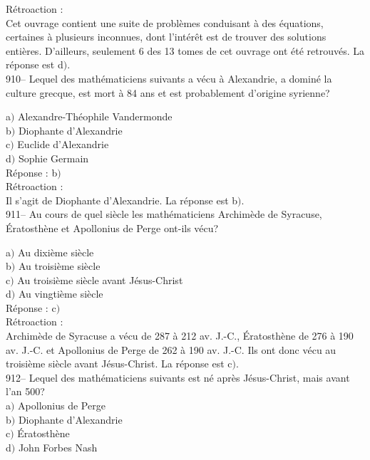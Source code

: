 ﻿\documentclass[letterpaper, 12pt]{article}
\begin{document}
R\'etroaction : \\
Cet ouvrage contient une suite de probl\`emes conduisant \`a des
\'equations, certaines \`a plusieurs inconnues, dont l'int\'er\^et
est de trouver des solutions enti\`eres.
D'ailleurs, seulement 6 des 13 tomes de cet ouvrage ont \'et\'e retrouv\'es.
La r\'eponse est d$)$.\\

910-- Lequel des math\'ematiciens suivants a v\'ecu \`a Alexandrie,
a domin\'e la culture grecque, est mort \`a 84 ans et est
probablement d'origine syrienne?

a$)$ Alexandre-Th\'eophile Vandermonde \\
b$)$ Diophante d'Alexandrie \\
c$)$ Euclide d'Alexandrie \\
d$)$ Sophie Germain\\

R\'eponse : b$)$\\

R\'etroaction : \\
Il s'agit de Diophante d'Alexandrie. La r\'eponse est b$)$.\\

911-- Au cours de quel si\`ecle les math\'ematiciens Archim\`ede de
Syracuse, \'Eratosth\`ene et Apollonius de Perge ont-ils v\'ecu?

a$)$ Au dixi\`eme si\`ecle \\
b$)$ Au troisi\`eme si\`ecle \\
c$)$ Au troisi\`eme si\`ecle avant J\'esus-Christ \\
d$)$ Au vingti\`eme si\`ecle   \\

R\'eponse : c$)$\\

R\'etroaction : \\
Archim\`ede de Syracuse a v\'ecu de 287 \`a 212 av. J.-C.,
\'Eratosth\`ene de 276 \`a 190 av. J.-C. et Apollonius de Perge de 262 \`a
190 av. J.-C. Ils ont donc v\'ecu au troisi\`eme si\`ecle avant
J\'esus-Christ. La r\'eponse est c$)$.\\

912-- Lequel des math\'ematiciens suivants est n\'e apr\`es J\'esus-Christ,
mais avant l'an 500?\\

a$)$ Apollonius de Perge \\
b$)$ Diophante d'Alexandrie \\
c$)$ \'Eratosth\`ene \\
d$)$ John Forbes Nash  \\
\end{document}
